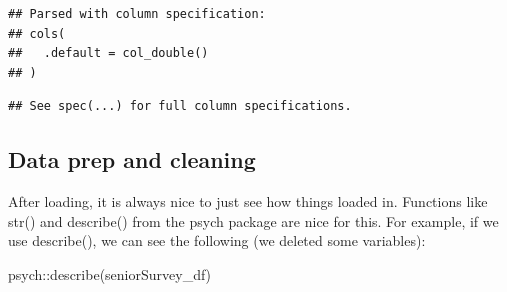 \documentclass[
]{book}
\newenvironment{Shaded}{\begin{snugshade}}{\end{snugshade}}
\newcommand{\FunctionTok}[1]{\textcolor[rgb]{0.00,0.00,0.00}{#1}}
\newcommand{\NormalTok}[1]{#1}
\newcommand{\SpecialCharTok}[1]{\textcolor[rgb]{0.00,0.00,0.00}{#1}}
\begin{document}
\begin{verbatim}
## Parsed with column specification:
## cols(
##   .default = col_double()
## )
\end{verbatim}

\begin{verbatim}
## See spec(...) for full column specifications.
\end{verbatim}

\hypertarget{data-prep-and-cleaning}{%
\subsection{Data prep and cleaning}\label{data-prep-and-cleaning}}

After loading, it is always nice to just see how things loaded in. Functions like str() and describe() from the psych package are nice for this. For example, if we use describe(), we can see the following (we deleted some variables):

\begin{Shaded}
\begin{Highlighting}[]
\NormalTok{psych}\SpecialCharTok{::}\FunctionTok{describe}\NormalTok{(seniorSurvey\_df)}
\end{Highlighting}
\end{Shaded}
\end{document}
